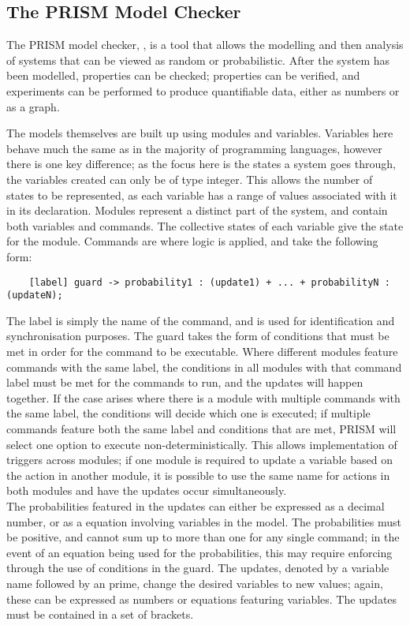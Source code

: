 \documentclass{l4proj}
\begin{document}
\subsection{The PRISM Model Checker}

The PRISM model checker, \cite{Pri}, is a tool that allows the modelling and then analysis of systems that can be viewed as random or probabilistic. After the system has been modelled, properties can be checked; properties can be verified, and experiments can be performed to produce quantifiable data, either as numbers or as a graph. 

The models themselves are built up using modules and variables. Variables here behave much the same as in the majority of programming languages, however there is one key difference; as the focus here is the states a system goes through, the variables created can only be of type integer. This allows the number of states to be represented, as each variable has a range of values associated with it in its declaration. Modules represent a distinct part of the system, and contain both variables and commands. The collective states of each variable give the state for the module. Commands are where logic is applied, and take the following form: 

\begin{lstlisting}
    [label] guard -> probability1 : (update1) + ... + probabilityN : (updateN);
\end{lstlisting}

The label is simply the name of the command, and is used for identification and synchronisation purposes. The guard takes the form of conditions that must be met in order for the command to be executable. Where different modules feature commands with the same label, the conditions in all modules with that command label must be met for the commands to run, and the updates will happen together. If the case arises where there is a module with multiple commands with the same label, the conditions will decide which one is executed; if multiple commands feature both the same label and conditions that are met, PRISM will select one option to execute non-deterministically. This allows implementation of triggers across modules; if one module is required to update a variable based on the action in another module, it is possible to use the same name for actions in both modules and have the updates occur simultaneously.\\
The probabilities featured in the updates can either be expressed as a decimal number, or as a equation involving variables in the model. The probabilities must be positive, and cannot sum up to more than one for any single command; in the event of an equation being used for the probabilities, this may require enforcing through the use of conditions in the guard. The updates, denoted by a variable name followed by an prime, change the desired variables to new values; again, these can be expressed as numbers or equations featuring variables. The updates must be contained in a set of brackets.
\end{document}
